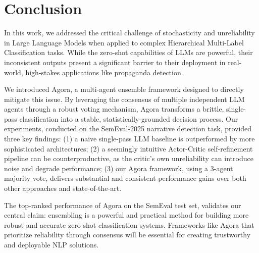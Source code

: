 \section{Conclusion}

In this work, we addressed the critical challenge of stochasticity and unreliability in Large Language Models when applied to complex Hierarchical Multi-Label Classification tasks. While the zero-shot capabilities of LLMs are powerful, their inconsistent outputs present a significant barrier to their deployment in real-world, high-stakes applications like propaganda detection.

We introduced Agora, a multi-agent ensemble framework designed to directly mitigate this issue. By leveraging the consensus of multiple independent LLM agents through a robust voting mechanism, Agora transforms a brittle, single-pass classification into a stable, statistically-grounded decision process.
Our experiments, conducted on the SemEval-2025 narrative detection task, provided three key findings: 
(1) a naive single-pass LLM baseline is outperformed by more sophisticated architectures; 
(2) a seemingly intuitive Actor-Critic self-refinement pipeline can be counterproductive, as the critic's own unreliability can introduce noise and degrade performance; 
(3) our Agora framework, using a 3-agent majority vote, delivers substantial and consistent performance gains over both other approaches and state-of-the-art.

The top-ranked performance of Agora on the SemEval test set, validates our central claim: ensembling is a powerful and practical method for building more robust and accurate zero-shot classification systems. 
Frameworks like Agora that prioritize reliability through consensus will be essential for creating trustworthy and deployable NLP solutions.